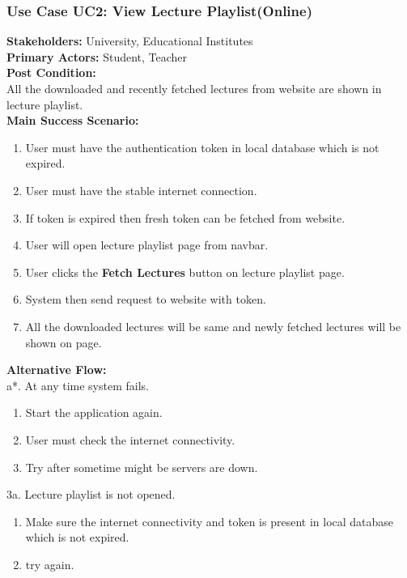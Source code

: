 \documentclass[12pt]{article}
\begin{document}
\subsubsection{Use Case UC2: View Lecture Playlist(Online)}
\textbf{Stakeholders: } University, Educational Institutes \\
\textbf{Primary Actors: } Student, Teacher \\
\textbf{Post Condition: }\\
All the downloaded and recently fetched lectures from website are shown in lecture playlist.\\
\textbf{Main Success Scenario: }
\begin{enumerate}
\item User must have the authentication token in local database which is not expired.
\item User must have the stable internet connection.
\item If token is expired then fresh token can be fetched from website.
\item User will open lecture playlist page from navbar.
\item User clicks the \textbf{Fetch Lectures} button on lecture playlist page.
\item System then send request to website with token.
\item All the downloaded lectures will be same and newly fetched lectures will be shown on page. 
\end{enumerate}
\textbf{Alternative Flow: }\\
a*. At any time system fails.
\begin{enumerate}
\item Start the application again.
\item User must check the internet connectivity.
\item Try after sometime might be servers are down.
\end{enumerate}
3a. Lecture playlist is not opened.
\begin{enumerate}
\item Make sure the internet connectivity and token is present in local database which is not expired.
\item try again.
\end{enumerate}
\end{document}
